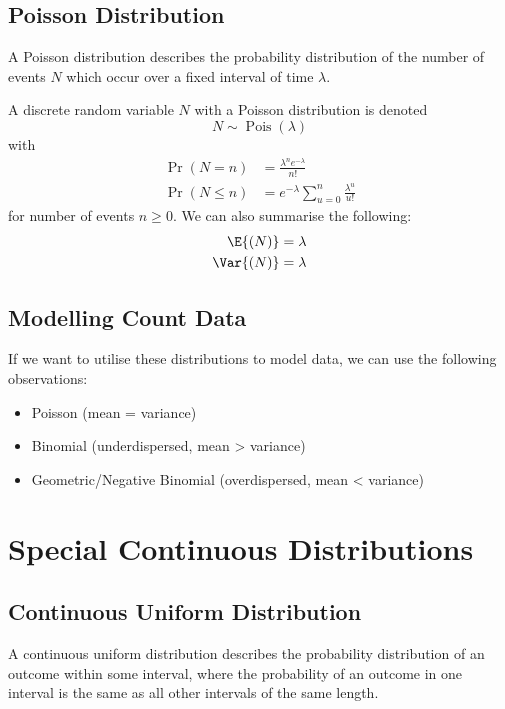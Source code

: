 \documentclass{article}
\begin{document}
\subsection{Poisson Distribution}
A Poisson distribution describes the probability distribution of the number of events \(N\) which occur over a fixed interval of time \(\lambda\).

A discrete random variable \(N\) with a Poisson distribution is denoted
\begin{equation*}
    N \sim \operatorname{Pois}{\left( \lambda \right)}
\end{equation*}
with
\begin{align*}
    \Pr{\left( N = n \right)}    & = \frac{\lambda^n e^{-\lambda}}{n!}                \\
    \Pr{\left( N \leq n \right)} & = e^{-\lambda} \sum_{u = 0}^n \frac{\lambda^u}{u!}
\end{align*}
for number of events \(n \geq 0\).
We can also summarise the following:
\begin{align*}
    \E{\left( N \right)}   & = \lambda \\
    \Var{\left( N \right)} & = \lambda
\end{align*}
\subsection{Modelling Count Data}
If we want to utilise these distributions to model data, we can use the following observations:
\begin{itemize}
    \item Poisson (mean = variance)
    \item Binomial (underdispersed, mean > variance)
    \item Geometric/Negative Binomial (overdispersed, mean < variance)
\end{itemize}
\section{Special Continuous Distributions}
\subsection{Continuous Uniform Distribution}
A continuous uniform distribution describes the probability distribution of an outcome within some
interval, where the probability of an outcome in one interval is the same as all other intervals of the same length.
\end{document}
